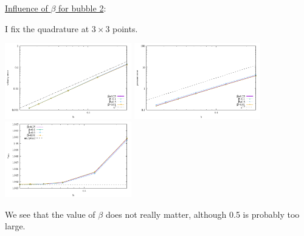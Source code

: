 \underline{Influence of $\beta$ for bubble 2}:

I fix the quadrature at $3\times 3$ points. 

\begin{center}
\includegraphics[width=5.5cm]{python_codes/fieldstone_74/results/errors_v}
\includegraphics[width=5.5cm]{python_codes/fieldstone_74/results/errors_p}
\includegraphics[width=5.5cm]{python_codes/fieldstone_74/results/vrms.pdf}
\end{center}

We see that the value of $\beta$ does not really matter, although 0.5 is probably too large.


